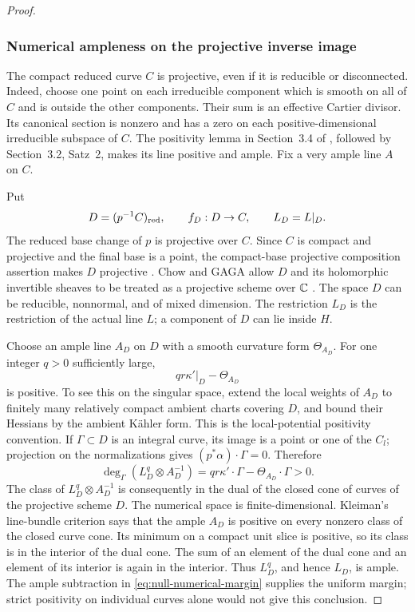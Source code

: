 \begin{proof}
\subsubsection*{Numerical ampleness on the projective inverse image}

The compact reduced curve \(C\) is projective, even if it is reducible
or disconnected.  Indeed, choose one point on each irreducible component
which is smooth on all of \(C\) and is outside the other components.
Their sum is an effective Cartier divisor.  Its canonical section is
nonzero and has a zero on each positive-dimensional irreducible subspace
of \(C\).  The positivity lemma in Section~3.4 of
\cite{Grauert1962}, followed by Section~3.2, Satz~2, makes its line
positive and ample.  Fix a very ample line \(A\) on \(C\).

Put
\[
 D=(p^{-1}C)_{\mathrm{red}},\qquad f_D:D\to C,\qquad L_D=L|_D .
\]
The reduced base change of \(p\) is projective over \(C\).  Since \(C\)
is compact and projective and the final base is a point, the
compact-base projective composition assertion makes \(D\) projective
\cite[Remark~2.11]{DasHaconPaun2024}.  Chow and GAGA allow \(D\) and
its holomorphic invertible sheaves to be treated as a projective scheme
over \(\mathbb C\) \cite{Serre1956GAGA}.  The space \(D\) can be reducible,
nonnormal, and of mixed dimension.  The restriction \(L_D\) is the
restriction of the actual line \(L\); a component of \(D\) can lie
inside \(H\).

Choose an ample line \(A_D\) on \(D\) with a smooth curvature form
\(\Theta_{A_D}\).  For one integer \(q>0\) sufficiently large,
\[
 qr\kappa'|_D-\Theta_{A_D}
\]
is positive.  To see this on the singular space, extend the local
weights of \(A_D\) to finitely many relatively compact ambient charts
covering \(D\), and bound their Hessians by the ambient K\"ahler form.
This is the local-potential positivity convention.  If
\(\Gamma\subset D\) is an integral curve, its image is a point or one
of the \(C_l\); projection on the normalizations gives
\((p^*\alpha)\cdot\Gamma=0\).  Therefore
\begin{equation}\label{eq:null-numerical-margin}
 \deg_\Gamma(L_D^q\otimes A_D^{-1})
   =qr\kappa'\cdot\Gamma-\Theta_{A_D}\cdot\Gamma>0 .
\end{equation}
The class of \(L_D^q\otimes A_D^{-1}\) is consequently in the dual of
the closed cone of curves of the projective scheme \(D\).  The numerical
space is finite-dimensional.  Kleiman's line-bundle criterion
\cite[Section~4.8 and Theorem~4.10]{Fujino2009Fundamental} says that the
ample \(A_D\) is positive on every nonzero class of the closed curve
cone.  Its minimum on a compact unit slice is positive, so its class
is in the interior of the dual cone.
The sum of an element of the dual cone and an element of its interior
is again in the interior.  Thus \(L_D^q\), and hence \(L_D\), is ample.
The ample subtraction in \eqref{eq:null-numerical-margin} supplies the
uniform margin; strict positivity on individual curves alone would not
give this conclusion.


\end{proof}
